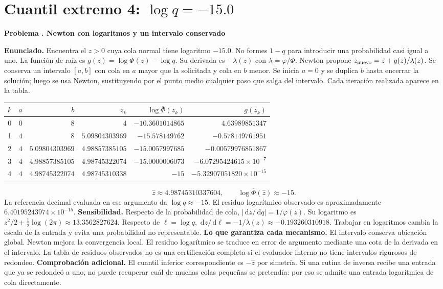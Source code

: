 \documentclass[11pt,a4paper]{article}
\newcommand{\dd}{\,\mathrm d}
\theoremstyle{definition}
\newcounter{problema}
\newenvironment{resuelto}[1]{\refstepcounter{problema}\par\medskip\Needspace{6\baselineskip}\textbf{Problema \theproblema. #1}\par}{\par\medskip}
\newcommand{\SF}{\overline\Phi}
\begin{document}
\section{\texorpdfstring{Cuantil extremo 4: $\log q=-15.0$}{Cuantil extremo 4: log q=-15.0}}
\begin{resuelto}{Newton con logaritmos y un intervalo conservado}
\textbf{Enunciado.} Encuentra el $z>0$ cuya cola normal tiene logaritmo $-15.0$. No formes $1-q$ para introducir una probabilidad casi igual a uno.
La función de raíz es $g(z)=\log\SF(z)-\log q$. Su derivada es $-\lambda(z)$ con $\lambda=\varphi/\SF$. Newton propone $z_{\rm nuevo}=z+g(z)/\lambda(z)$. Se conserva un intervalo $[a,b]$ con cola en $a$ mayor que la solicitada y cola en $b$ menor.
Se inicia $a=0$ y se duplica $b$ hasta encerrar la solución; luego se usa Newton, sustituyendo por el punto medio cualquier paso que salga del intervalo. Cada iteración realizada aparece en la tabla.

\begin{center}\small\begin{tabular}{rrrrrr}
\toprule
$k$&$a$&$b$&$z_k$&$\log\SF(z_k)$&$g(z_k)$\\
\midrule
0&$0$&$8$&$4$&$-10.3601014865$&$4.63989851347$\\
1&$4$&$8$&$5.09804303969$&$-15.578149762$&$-0.578149761951$\\
2&$4$&$5.09804303969$&$4.98857385105$&$-15.0057997685$&$-0.00579976851867$\\
3&$4$&$4.98857385105$&$4.98745322074$&$-15.0000006073$&$-6.07295424615\times10^{-7}$\\
4&$4$&$4.98745322074$&$4.98745310338$&$-15$&$-5.32907051820\times10^{-15}$\\
\bottomrule\end{tabular}\end{center}
\[
\widehat z\approx4.98745310337604,\qquad \log\SF(\widehat z)\approx-15.
\]
La referencia decimal evaluada en ese argumento da $\log q\approx-15$. El residuo logarítmico observado es aproximadamente $6.40195243974\times10^{-15}$.
\textbf{Sensibilidad.} Respecto de la probabilidad de cola, $|\dd z/\dd q|=1/\varphi(z)$. Su logaritmo es $z^2/2+\tfrac12\log(2\pi)\approx13.3562827624$. Respecto de $\ell=\log q$, $\dd z/\dd\ell=-1/\lambda(z)\approx-0.193260310918$. Trabajar en logaritmos cambia la escala de la entrada y evita una probabilidad no representable.
\textbf{Lo que garantiza cada mecanismo.} El intervalo conserva ubicación global. Newton mejora la convergencia local. El residuo logarítmico se traduce en error de argumento mediante una cota de la derivada en el intervalo. La tabla de residuos observados no es una certificación completa si el evaluador interno no tiene intervalos rigurosos de redondeo.
\textbf{Comprobación adicional.} El cuantil inferior correspondiente es $-\widehat z$ por simetría. Si una rutina de inversa recibe una entrada que ya se redondeó a uno, no puede recuperar cuál de muchas colas pequeñas se pretendía: por eso se admite una entrada logarítmica de cola directamente.
\end{resuelto}
\end{document}
